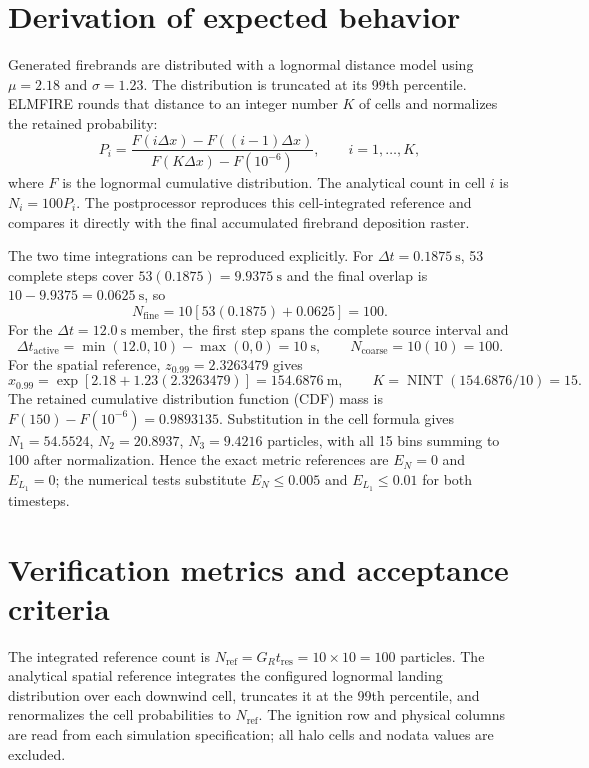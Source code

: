 \section{Derivation of expected behavior}
Generated firebrands are distributed with a lognormal distance model using
$\mu=2.18$ and $\sigma=1.23$. The distribution is truncated at its 99th
percentile. ELMFIRE rounds that distance to an integer number $K$ of cells and
normalizes the retained probability:
\[
  P_i=\frac{F(i\Delta x)-F((i-1)\Delta x)}
             {F(K\Delta x)-F(10^{-6})},\qquad i=1,\ldots,K,
\]
where $F$ is the lognormal cumulative distribution. The analytical count in
cell $i$ is $N_i=100P_i$. The postprocessor reproduces this cell-integrated
reference and compares it directly with the final accumulated firebrand deposition raster.

The two time integrations can be reproduced explicitly.  For
\(\Delta t=0.1875~\mathrm{s}\), 53 complete steps cover
\(53(0.1875)=9.9375~\mathrm{s}\) and the final overlap is
\(10-9.9375=0.0625~\mathrm{s}\), so
\[
 N_{\mathrm{fine}}=10[53(0.1875)+0.0625]=100.
\]
For the \(\Delta t=12.0~\mathrm{s}\) member, the first step spans the complete
source interval and
\[
 \Delta t_{\mathrm{active}}=\min(12.0,10)-\max(0,0)=10~\mathrm{s},
 \qquad N_{\mathrm{coarse}}=10(10)=100.
\]
For the spatial reference, \(z_{0.99}=2.3263479\) gives
\[
 x_{0.99}=\exp[2.18+1.23(2.3263479)]=154.6876~\mathrm{m},
 \qquad K=\operatorname{NINT}(154.6876/10)=15.
\]
The retained cumulative distribution function (CDF) mass is
\(F(150)-F(10^{-6})=0.9893135\).  Substitution in the cell formula gives
\(N_1=54.5524\), \(N_2=20.8937\), \(N_3=9.4216\) particles, with all 15
bins summing to 100 after normalization.  Hence the exact metric references
are \(E_N=0\) and \(E_{L_1}=0\); the numerical tests substitute
\(E_N\leq0.005\) and \(E_{L_1}\leq0.01\) for both timesteps.

\section{Verification metrics and acceptance criteria}

The integrated reference count is
\(N_{\mathrm{ref}}=G_Rt_{\mathrm{res}}=10\times10=100\) particles. The analytical
spatial reference integrates the configured lognormal landing distribution over
each downwind cell, truncates it at the 99th percentile, and renormalizes the
cell probabilities to \(N_{\mathrm{ref}}\). The ignition row and physical columns
are read from each simulation specification; all halo cells and nodata values are excluded.

